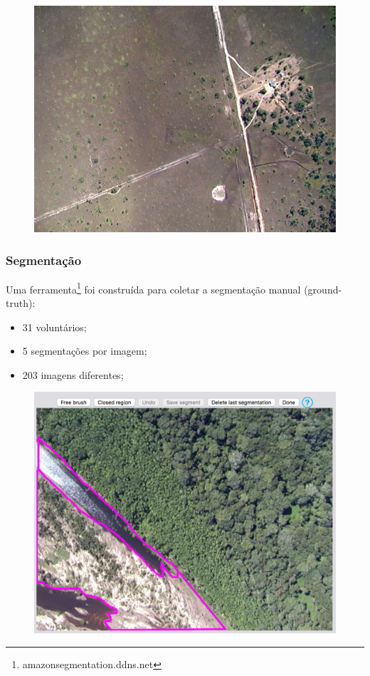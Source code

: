 \documentclass[t]{beamer}
\begin{document}
\begin{frame}
\begin{multicols}{3}
\begin{figure}
		\end{figure}
		\begin{figure}
			\includegraphics[scale=0.3]{imgs/amostra3}
		\end{figure}
	\end{multicols}

\end{frame}

\begin{frame}
	\frametitle{Segmentação}

	Uma ferramenta\footnote{amazonsegmentation.ddns.net} foi construída para coletar a segmentação manual (ground-truth):
	\begin{itemize}
		\item 31 voluntários;
		\item 5 segmentações por imagem;
		\item 203 imagens diferentes;
	\end{itemize}

	\begin{figure}[h]
  		\centering
		\includegraphics[scale=0.25]{imgs/manualseg}
	\end{figure}

\end{frame}
\end{document}
